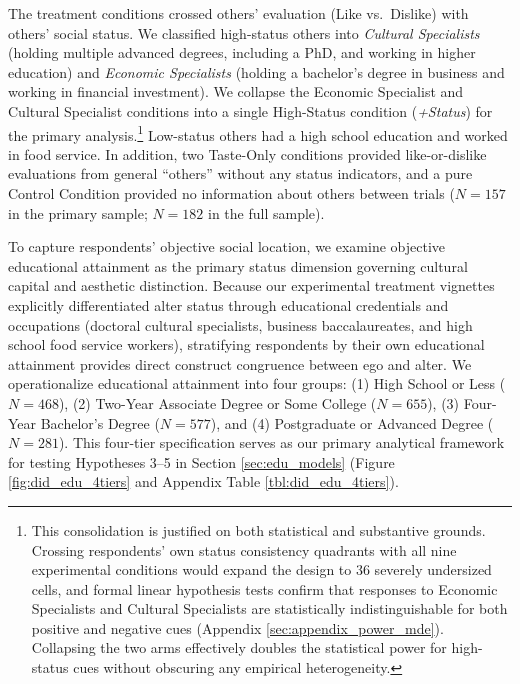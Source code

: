 \documentclass[12pt, letterpaper]{article}
\begin{document}
The treatment conditions crossed others' evaluation (Like vs.\ Dislike) with others' social status. We classified high-status others into \textit{Cultural Specialists} (holding multiple advanced degrees, including a PhD, and working in higher education) and \textit{Economic Specialists} (holding a bachelor's degree in business and working in financial investment). We collapse the Economic Specialist and Cultural Specialist conditions into a single High-Status condition (\textit{+Status}) for the primary analysis.\footnote{This consolidation is justified on both statistical and substantive grounds. Crossing respondents' own status consistency quadrants with all nine experimental conditions would expand the design to 36 severely undersized cells, and formal linear hypothesis tests confirm that responses to Economic Specialists and Cultural Specialists are statistically indistinguishable for both positive and negative cues (Appendix \ref{sec:appendix_power_mde}). Collapsing the two arms effectively doubles the statistical power for high-status cues without obscuring any empirical heterogeneity.} Low-status others had a high school education and worked in food service. In addition, two Taste-Only conditions provided like-or-dislike evaluations from general ``others'' without any status indicators, and a pure Control Condition provided no information about others between trials ($N=157$ in the primary sample; $N=182$ in the full sample).

To capture respondents' objective social location, we examine objective educational attainment as the primary status dimension governing cultural capital and aesthetic distinction. Because our experimental treatment vignettes explicitly differentiated alter status through educational credentials and occupations (doctoral cultural specialists, business baccalaureates, and high school food service workers), stratifying respondents by their own educational attainment provides direct construct congruence between ego and alter. We operationalize educational attainment into four groups: (1) High School or Less ($N = 468$), (2) Two-Year Associate Degree or Some College ($N = 655$), (3) Four-Year Bachelor's Degree ($N = 577$), and (4) Postgraduate or Advanced Degree ($N = 281$). This four-tier specification serves as our primary analytical framework for testing Hypotheses 3--5 in Section \ref{sec:edu_models} (Figure \ref{fig:did_edu_4tiers} and Appendix Table \ref{tbl:did_edu_4tiers}).
\end{document}
